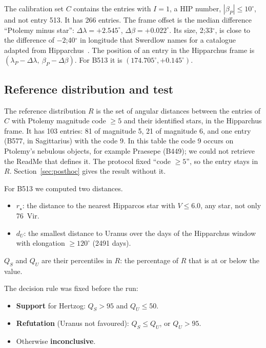 \documentclass[11pt]{article}
\begin{document}
The calibration set $C$ contains the entries with $I=1$, a HIP number, $|\beta_P|\le10^\circ$, and not entry 513. It has 266 entries. The frame offset is the median difference ``Ptolemy minus star'': $\Delta\lambda=+2.545^\circ$, $\Delta\beta=+0.022^\circ$. Its size, 2;33$^\circ$, is close to the difference of $-2$;40$^\circ$ in longitude that Swerdlow names for a catalogue adapted from Hipparchus~\cite[n.~4]{swerdlow2020}. The position of an entry in the Hipparchus frame is $(\lambda_P-\Delta\lambda,\ \beta_P-\Delta\beta)$. For B513 it is $(174.705^\circ, +0.145^\circ)$.

\subsection{Reference distribution and test}
The reference distribution $R$ is the set of angular distances between the entries of $C$ with Ptolemy magnitude code $\ge5$ and their identified stars, in the Hipparchus frame. It has 103 entries: 81 of magnitude 5, 21 of magnitude 6, and one entry (B577, in Sagittarius) with the code 9. In this table the code 9 occurs on Ptolemy's nebulous objects, for example Praesepe (B449); we could not retrieve the ReadMe that defines it. The protocol fixed ``code $\ge5$'', so the entry stays in $R$. Section~\ref{sec:posthoc} gives the result without it.

For B513 we computed two distances.
\begin{itemize}
\item $r_\star$: the distance to the nearest Hipparcos star with $V\le6.0$, any star, not only 76~Vir.
\item $d_U$: the smallest distance to Uranus over the days of the Hipparchus window with elongation $\ge120^\circ$ (2491 days).
\end{itemize}
$Q_S$ and $Q_U$ are their percentiles in $R$: the percentage of $R$ that is at or below the value.

The decision rule was fixed before the run:
\begin{itemize}
\item \textbf{Support} for Hertzog: $Q_S>95$ and $Q_U\le50$.
\item \textbf{Refutation} (Uranus not favoured): $Q_S\le Q_U$, or $Q_U>95$.
\item Otherwise \textbf{inconclusive}.
\end{itemize}
\end{document}
